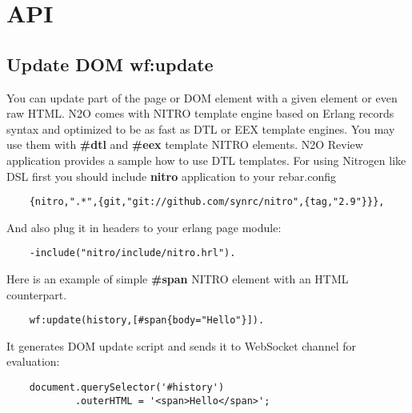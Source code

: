 \section{API}

\subsection{Update DOM \bf{wf:update}}
You can update part of the page or DOM element with a given
element or even raw HTML. N2O comes with NITRO template engine
based on Erlang records syntax and optimized to be as fast as DTL or EEX template engines.
You may use them with {\bf \#dtl} and {\bf \#eex} template NITRO elements.
N2O Review application provides a sample how to use DTL templates.
For using Nitrogen like DSL first you should include {\bf nitro} application to your
rebar.config

\vspace{1\baselineskip}
\begin{lstlisting}
    {nitro,".*",{git,"git://github.com/synrc/nitro",{tag,"2.9"}}},
\end{lstlisting}
\vspace{1\baselineskip}

And also plug it in headers to your erlang page module:

\vspace{1\baselineskip}
\begin{lstlisting}
    -include("nitro/include/nitro.hrl").
\end{lstlisting}
\vspace{1\baselineskip}

Here is an example of simple {\bf \#span} NITRO element with an HTML counterpart.

\vspace{1\baselineskip}
\begin{lstlisting}
    wf:update(history,[#span{body="Hello"}]).
\end{lstlisting}
\vspace{1\baselineskip}

It generates DOM update script and sends it to
WebSocket channel for evaluation:

\vspace{1\baselineskip}
\begin{lstlisting}
    document.querySelector('#history')
            .outerHTML = '<span>Hello</span>';
\end{lstlisting}
\vspace{1\baselineskip}

